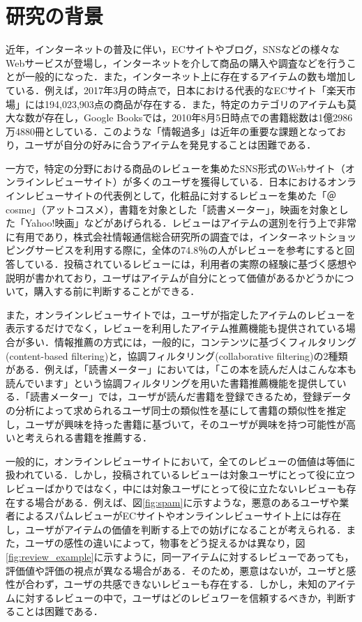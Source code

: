 \documentclass[a4paper,11pt,oneside,openany]{jsbook}
\begin{document}
	\section{研究の背景}
近年，インターネットの普及に伴い，ECサイトやブログ，SNSなどの様々なWebサービスが登場し，インターネットを介して商品の購入や調査などを行うことが一般的になった．また，インターネット上に存在するアイテムの数も増加している．例えば，2017年3月の時点で，日本における代表的なECサイト「楽天市場」\cite{rakuten}には194,023,903点の商品が存在する\cite{rakuten_info}．また，特定のカテゴリのアイテムも莫大な数が存在し，Google Booksでは，2010年8月5日時点での書籍総数は1億2986万4880冊としている\cite{google}．このような「情報過多」は近年の重要な課題となっており\cite{info}，ユーザが自分の好みに合うアイテムを発見することは困難である．
\par
一方で，特定の分野における商品のレビューを集めたSNS形式のWebサイト（オンラインレビューサイト）が多くのユーザを獲得している．日本におけるオンラインレビューサイトの代表例として，化粧品に対するレビューを集めた「＠cosme」（アットコスメ）\cite{@cosme}，書籍を対象とした「読書メーター」\cite{bookmeter}，映画を対象とした「Yahoo!映画」\cite{yahoo}などがあげられる．レビューはアイテムの選別を行う上で非常に有用であり，株式会社情報通信総合研究所の調査\cite{ict}では，インターネットショッピングサービスを利用する際に，全体の74.8％の人がレビューを参考にすると回答している．投稿されているレビューには，利用者の実際の経験に基づく感想や説明が書かれており，ユーザはアイテムが自分にとって価値があるかどうかについて，購入する前に判断することができる．
\par
また，オンラインレビューサイトでは，ユーザが指定したアイテムのレビューを表示するだけでなく，レビューを利用したアイテム推薦機能も提供されている場合が多い．情報推薦の方式には，一般的に，コンテンツに基づくフィルタリング(content-based filtering)と，協調フィルタリング(collaborative filtering)の2種類がある\cite{hijikata2}．例えば，「読書メーター」においては，「この本を読んだ人はこんな本も読んでいます」という協調フィルタリングを用いた書籍推薦機能を提供している．「読書メーター」では，ユーザが読んだ書籍を登録できるため，登録データの分析によって求められるユーザ同士の類似性を基にして書籍の類似性を推定し，ユーザが興味を持った書籍に基づいて，そのユーザが興味を持つ可能性が高いと考えられる書籍を推薦する．
\par
一般的に，オンラインレビューサイトにおいて，全てのレビューの価値は等価に扱われている．しかし，投稿されているレビューは対象ユーザにとって役に立つレビューばかりではなく，中には対象ユーザにとって役に立たないレビューも存在する場合がある．例えば、図\ref{fig:spam}に示すような，悪意のあるユーザや業者によるスパムレビューがECサイトやオンラインレビューサイト上には存在し，ユーザがアイテムの価値を判断する上での妨げになることが考えられる．また，ユーザの感性の違いによって，物事をどう捉えるかは異なり，図\ref{fig:review_example}に示すように，同一アイテムに対するレビューであっても，評価値や評価の視点が異なる場合がある．そのため，悪意はないが，ユーザと感性が合わず，ユーザの共感できないレビューも存在する．しかし，未知のアイテムに対するレビューの中で，ユーザはどのレビュワーを信頼するべきか，判断することは困難である．
\end{document}
